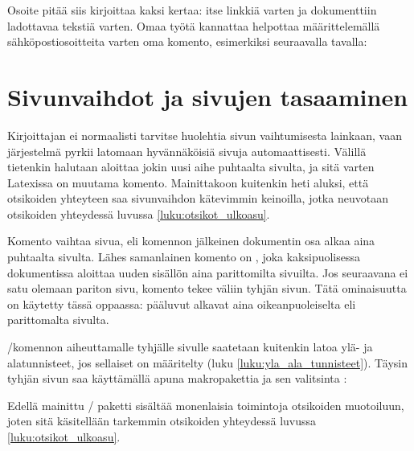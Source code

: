 Osoite pitää siis kirjoittaa kaksi kertaa: itse linkkiä varten ja
dokumenttiin ladottavaa tekstiä varten. Omaa työtä kannattaa helpottaa
määrittelemällä sähköpostiosoitteita varten oma komento, esimerkiksi
seuraavalla tavalla:

\begin{koodilohkosis}
  \newcommand{\sposti}[1]{\href{mailto:#1}{\nolinkurl{#1}}}
\end{koodilohkosis}

\section{Sivunvaihdot ja sivujen tasaaminen}
\label{luku:sivunvaihdot}

Kirjoittajan ei normaalisti tarvitse huolehtia sivun vaihtumisesta
lainkaan, vaan järjestelmä pyrkii latomaan hyvännäköisiä sivuja
automaattisesti. Välillä tietenkin halutaan aloittaa jokin uusi aihe
puhtaalta sivulta, ja sitä varten Latexissa on muutama komento.
Mainittakoon kuitenkin heti aluksi, että otsikoiden yhteyteen saa
sivunvaihdon kätevimmin keinoilla, jotka neuvotaan otsikoiden yhteydessä
luvussa \ref{luku:otsikot_ulkoasu}.

Komento  vaihtaa sivua, eli komennon jälkeinen
dokumentin osa alkaa aina puhtaalta sivulta. Lähes samanlainen komento
on , joka kaksipuolisessa dokumentissa
aloittaa uuden sisällön aina parittomilta sivuilta. Jos seuraavana ei
satu olemaan pariton sivu, komento tekee väliin tyhjän sivun. Tätä
ominaisuutta on käytetty tässä oppaassa: pääluvut alkavat aina
oikeanpuoleiselta eli parittomalta sivulta.

\-/komennon aiheuttamalle tyhjälle sivulle
saatetaan kuitenkin latoa ylä- ja alatunnisteet, jos sellaiset on
määritelty (luku \ref{luku:yla_ala_tunnisteet}). Täysin tyhjän sivun saa
käyttämällä apuna makropakettia  ja
sen valitsinta :

\begin{koodilohkosis}
  \usepackage[clearempty]{titlesec}
\end{koodilohkosis}

Edellä mainittu \-/ paketti sisältää monenlaisia
toimintoja otsikoiden muotoiluun, joten sitä käsitellään tarkemmin
otsikoiden yhteydessä luvussa \ref{luku:otsikot_ulkoasu}.


